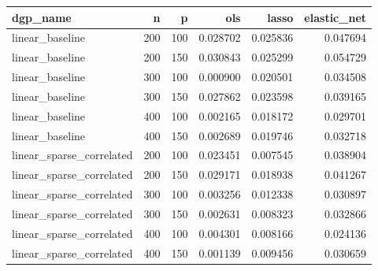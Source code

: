 \begin{table}[!htbp]
\centering
\begin{tabular}{lrrrrr}
 \hline
dgp\_name & n & p & ols & lasso & elastic\_net \\
 \hline
linear\_baseline & 200 & 100 & 0.028702 & 0.025836 & 0.047694 \\
linear\_baseline & 200 & 150 & 0.030843 & 0.025299 & 0.054729 \\
linear\_baseline & 300 & 100 & 0.000900 & 0.020501 & 0.034508 \\
linear\_baseline & 300 & 150 & 0.027862 & 0.023598 & 0.039165 \\
linear\_baseline & 400 & 100 & 0.002165 & 0.018172 & 0.029701 \\
linear\_baseline & 400 & 150 & 0.002689 & 0.019746 & 0.032718 \\
linear\_sparse\_correlated & 200 & 100 & 0.023451 & 0.007545 & 0.038904 \\
linear\_sparse\_correlated & 200 & 150 & 0.029171 & 0.018938 & 0.041267 \\
linear\_sparse\_correlated & 300 & 100 & 0.003256 & 0.012338 & 0.030897 \\
linear\_sparse\_correlated & 300 & 150 & 0.002631 & 0.008323 & 0.032866 \\
linear\_sparse\_correlated & 400 & 100 & 0.004301 & 0.008166 & 0.024136 \\
linear\_sparse\_correlated & 400 & 150 & 0.001139 & 0.009456 & 0.030659 \\
 \hline
\end{tabular}
\end{table}

